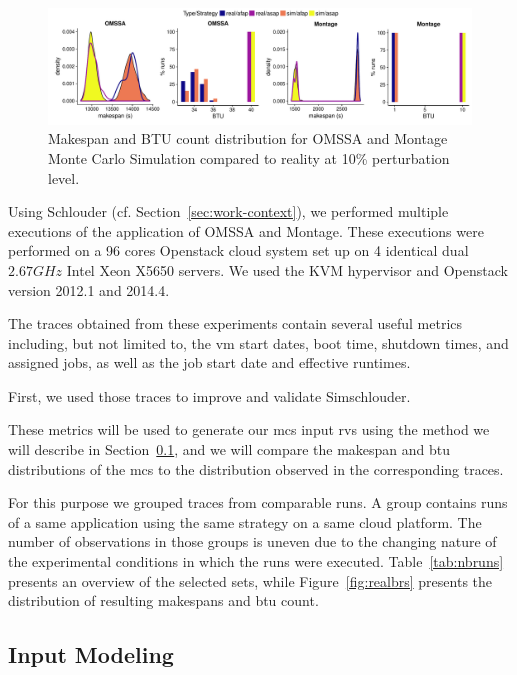 \documentclass[10pt,conference,compsocconf]{IEEEtran}
\begin{document}
\begin{figure}
	\includegraphics[width=\textwidth]{gfx/fit_plot.pdf}
	\caption{Makespan and BTU count distribution for OMSSA and Montage Monte
	Carlo Simulation compared to reality at 10\% perturbation
	level.}\label{fig:fit}
\end{figure}


Using Schlouder (cf. Section~\ref{sec:work-context}),
we performed multiple executions of the
application of OMSSA and Montage. These executions were performed on a 96 cores
Openstack cloud system set up on 4 identical dual $2.67GHz$ Intel Xeon X5650
servers. We used the KVM hypervisor and Openstack version 2012.1 and 2014.4.

The traces obtained  from  these  experiments contain  several
useful metrics  including, but  not limited  to, the  \ac{vm} start  dates, boot
time, shutdown  times, and assigned  jobs, as well as  the job start  date and
effective  runtimes. 

First, we  used  those traces to improve and validate Simschlouder.

These metrics will be used to  generate our \ac{mcs}
input \acp{rv} using the method we will describe in Section~\ref{sec:im}, and we
will compare  the makespan  and \ac{btu}  distributions of  the \ac{mcs}  to the
distribution observed in the corresponding traces.

For this purpose we grouped traces  from comparable runs.  A group contains runs
of a  same application  using the same  strategy on a  same cloud  platform. The
number of observations in  those groups is uneven due to  the changing nature of
the    experimental   conditions    in   which    the   runs    were   executed.
Table~\ref{tab:nbruns}  presents  an  overview   of  the  selected  sets,  while
Figure~\ref{fig:realbrs} presents the distribution of resulting makespans and \ac{btu} count.


\subsection{Input Modeling}\label{sec:im}
\end{document}

